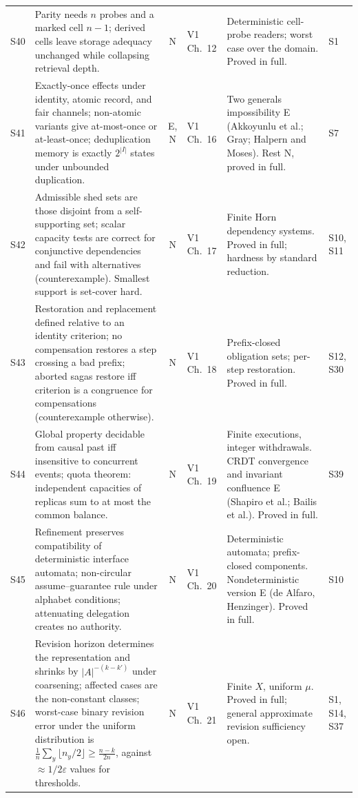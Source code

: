 \documentclass[10pt]{article}
\begin{document}
\begin{longtable}{@{}l p{} c l p{} p{}@{}}
S40 & Parity needs $n$ probes and a marked cell $n-1$; derived cells leave storage adequacy unchanged while collapsing retrieval depth. & N & V1 Ch.~12 & Deterministic cell-probe readers; worst case over the domain. Proved in full. & S1\\[3pt]
S41 & Exactly-once effects under identity, atomic record, and fair channels; non-atomic variants give at-most-once or at-least-once; deduplication memory is exactly $2^{|I|}$ states under unbounded duplication. & E, N & V1 Ch.~16 & Two generals impossibility E (Akkoyunlu et al.; Gray; Halpern and Moses). Rest N, proved in full. & S7\\[3pt]
S42 & Admissible shed sets are those disjoint from a self-supporting set; scalar capacity tests are correct for conjunctive dependencies and fail with alternatives (counterexample). Smallest support is set-cover hard. & N & V1 Ch.~17 & Finite Horn dependency systems. Proved in full; hardness by standard reduction. & S10, S11\\[3pt]
S43 & Restoration and replacement defined relative to an identity criterion; no compensation restores a step crossing a bad prefix; aborted sagas restore iff criterion is a congruence for compensations (counterexample otherwise). & N & V1 Ch.~18 & Prefix-closed obligation sets; per-step restoration. Proved in full. & S12, S30\\[3pt]
S44 & Global property decidable from causal past iff insensitive to concurrent events; quota theorem: independent capacities of replicas sum to at most the common balance. & N & V1 Ch.~19 & Finite executions, integer withdrawals. CRDT convergence and invariant confluence E (Shapiro et al.; Bailis et al.). Proved in full. & S39\\[3pt]
S45 & Refinement preserves compatibility of deterministic interface automata; non-circular assume--guarantee rule under alphabet conditions; attenuating delegation creates no authority. & N & V1 Ch.~20 & Deterministic automata; prefix-closed components. Nondeterministic version E (de Alfaro, Henzinger). Proved in full. & S10\\[3pt]
S46 & Revision horizon determines the representation and shrinks by $|A|^{-(k-k')}$ under coarsening; affected cases are the non-constant classes; worst-case binary revision error under the uniform distribution is $\frac1n\sum_y\lfloor n_y/2\rfloor\ge\frac{n-k}{2n}$, against $\approx1/2\varepsilon$ values for thresholds. & N & V1 Ch.~21 & Finite $X$, uniform $\mu$. Proved in full; general approximate revision sufficiency open. & S1, S14, S37\\[3pt]

\end{longtable}
\end{document}
